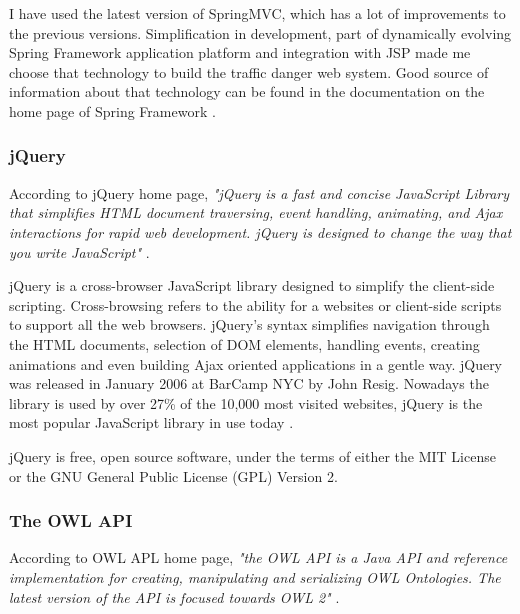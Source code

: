 I have used the latest version of SpringMVC, which has a lot of improvements to the previous versions. Simplification in development, part of dynamically evolving Spring Framework application platform and integration with JSP made me choose that technology to build the traffic danger web system. Good source of information about that technology can be found in the documentation on the home page of Spring Framework \cite{SpringHome}.

\subsubsection{jQuery}
\label{sss:jQuery}

According to jQuery home page, \textit{"jQuery is a fast and concise JavaScript Library that simplifies HTML document traversing, event handling, animating, and Ajax interactions for rapid web development. jQuery is designed to change the way that you write JavaScript"} \cite{jQueryHome}.

\newpage

jQuery is a cross-browser JavaScript library designed to simplify the client-side scripting. Cross-browsing refers to the ability for a websites or client-side scripts to support all the web browsers. jQuery's syntax simplifies navigation through the HTML documents, selection of DOM elements, handling events, creating animations and even building Ajax oriented applications in a gentle way. jQuery was released in January 2006 at BarCamp NYC by John Resig. Nowadays the library is used by over 27\% of the 10,000 most visited websites, jQuery is the most popular JavaScript library in use today \cite{jQueryUsageStatistics, UsageOfJavaScriptForWebsites}.

jQuery is free, open source software, under the terms of either the MIT License or the GNU General Public License (GPL) Version 2.

\subsubsection{The OWL API}
\label{sss:theOwlApi}

According to OWL APL home page, \textit{"the OWL API is a Java API and reference implementation for creating, manipulating and serializing OWL Ontologies. The latest version of the API is focused towards OWL 2"} \cite{OWLAPIHome}.

\bigskip

